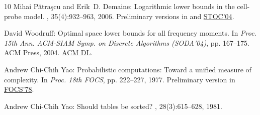 \documentclass[11pt]{article}
\numberwithin{equation}{section}
\theoremstyle{definition}
\theoremstyle{plain}
\begin{document}
\begin{thebibliography}{10}
{\sc Mihai P\u{a}tra\c{s}cu and Erik~D. Demaine}: Logarithmic lower bounds in
  the cell-probe model.
, 35(4):932--963, 2006.
\newblock Preliminary versions in \cite{PD2004:Partial-sums} and
  \href{http:doi.org/10.1145/1007352.1007435}{STOC'04}.

{\sc David Woodruff}: Optimal space lower bounds for all frequency moments.
\newblock In {\em Proc. 15th Ann. ACM-SIAM Symp. on Discrete Algorithms
  (SODA'04)}, pp. 167--175. ACM Press, 2004.
\newblock \href{https://dl.acm.org/citation.cfm?id=982792.982817}{ACM DL}.

{\sc Andrew Chi-Chih Yao}: Probabilistic computations: {T}oward a unified
  measure of complexity.
\newblock In {\em Proc. 18th FOCS}, pp. 222--227, 1977.
\newblock Preliminary version in
  \href{https:doi.org/10.1145/322261.322274}{FOCS'78}.

{\sc Andrew Chi-Chih Yao}: Should tables be sorted?
, 28(3):615--628, 1981.
\newblock [\epfmtdoi{10.1145/322261.322274}]

\end{thebibliography}
\end{document}
